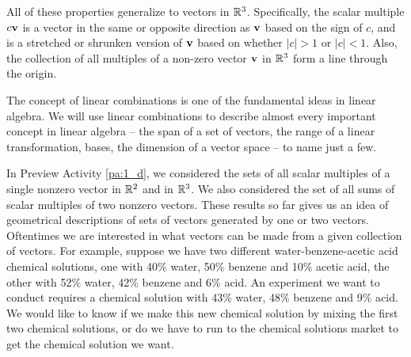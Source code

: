 All of these properties generalize to vectors in $\mathbb{R}^3$. Specifically, the scalar multiple $c\mathbf{v}$ is a vector in the same or opposite direction as $\mathbf{v}$ based on the sign of $c$, and is a stretched or shrunken version of $\mathbf{v}$ based on whether $|c|>1$ or $|c|<1$. Also, the collection of all multiples of a non-zero vector $\mathbf{v}$ in $\mathbb{R}^3$ form a line through the origin.

\label{sec:lin_comb_vec}

The concept of linear combinations is one of the fundamental ideas in linear algebra. We will use linear combinations to describe almost every important concept in linear algebra -- the span of a set of vectors, the range of a linear transformation, bases, the dimension of a vector space -- to name just a few. 

In Preview Activity \ref{pa:1_d}, we considered the sets of all scalar multiples of a single nonzero vector in $\mathbb{R}^2$ and in $\mathbb{R}^3$. We also considered the set of all sums of scalar multiples of two nonzero vectors. These results so far gives us an idea of geometrical descriptions of sets of vectors generated by one or two vectors. 
Oftentimes we are interested in what vectors can be made from a given collection of vectors. For example, suppose we have two different water-benzene-acetic acid chemical solutions, one with 40\% water, 50\% benzene and 10\% acetic acid, the other with 52\% water, 42\% benzene and 6\% acid. An experiment we want to conduct requires a chemical solution with 43\% water, 48\% benzene and 9\% acid. We would like to know if we make this new chemical solution by mixing the first two chemical solutions, or do we have to run to the chemical solutions market to get the chemical solution we want.

